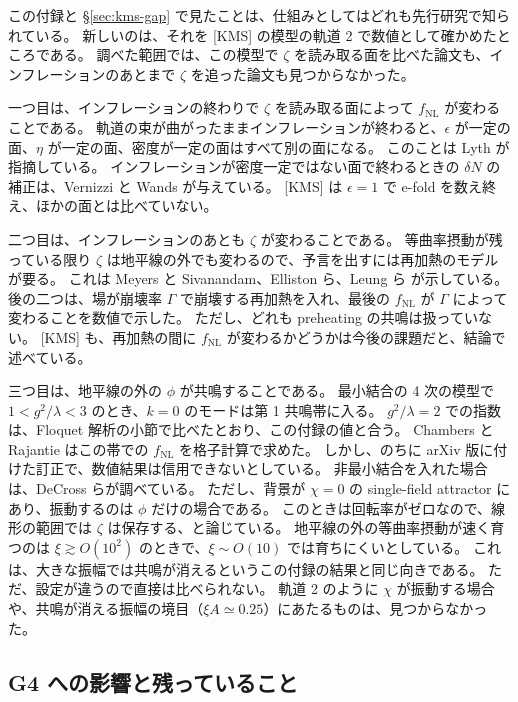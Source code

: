 \documentclass[a4paper,11pt]{ltjsarticle}
\newcommand{\fnl}{f_{\mathrm{NL}}}
\begin{document}
この付録と \S\ref{sec:kms-gap} で見たことは、仕組みとしてはどれも先行研究で知られている。
新しいのは、それを [KMS] の模型の軌道 2 で数値として確かめたところである。
調べた範囲では、この模型で $\zeta$ を読み取る面を比べた論文も、インフレーションのあとまで $\zeta$ を追った論文も見つからなかった。

一つ目は、インフレーションの終わりで $\zeta$ を読み取る面によって $\fnl$ が変わることである。
軌道の束が曲がったままインフレーションが終わると、$\epsilon$ が一定の面、$\eta$ が一定の面、密度が一定の面はすべて別の面になる。
このことは Lyth が指摘している\cite{Lyth2005}。
インフレーションが密度一定ではない面で終わるときの $\delta N$ の補正は、Vernizzi と Wands が与えている\cite{VernizziWands2006}。
[KMS] は $\epsilon=1$ で e-fold を数え終え、ほかの面とは比べていない\cite{KMS2013}。

二つ目は、インフレーションのあとも $\zeta$ が変わることである。
等曲率摂動が残っている限り $\zeta$ は地平線の外でも変わるので、予言を出すには再加熱のモデルが要る。
これは Meyers と Sivanandam\cite{MeyersSivanandam2011}、Elliston ら\cite{EMST2011}、Leung ら\cite{LTBC2012} が示している。
後の二つは、場が崩壊率 $\Gamma$ で崩壊する再加熱を入れ、最後の $\fnl$ が $\Gamma$ によって変わることを数値で示した。
ただし、どれも preheating の共鳴は扱っていない。
[KMS] も、再加熱の間に $\fnl$ が変わるかどうかは今後の課題だと、結論で述べている\cite{KMS2013}。

三つ目は、地平線の外の $\phi$ が共鳴することである。
最小結合の 4 次の模型で $1<g^2/\lambda<3$ のとき、$k=0$ のモードは第 1 共鳴帯に入る\cite{ChambersRajantie2008}。
$g^2/\lambda=2$ での指数は、Floquet 解析の小節で比べたとおり、この付録の値と合う\cite{BFHK2009}。
Chambers と Rajantie はこの帯での $\fnl$ を格子計算で求めた。
しかし、のちに arXiv 版に付けた訂正で、数値結果は信用できないとしている\cite{ChambersRajantie2008}。
非最小結合を入れた場合は、DeCross らが調べている\cite{DeCross2018,DeCross2018b,DeCross2018c}。
ただし、背景が $\chi=0$ の single-field attractor にあり、振動するのは $\phi$ だけの場合である。
このときは回転率がゼロなので、線形の範囲では $\zeta$ は保存する、と論じている\cite{DeCross2018c}。
地平線の外の等曲率摂動が速く育つのは $\xi\gtrsim O(10^2)$ のときで、$\xi\sim O(10)$ では育ちにくいとしている\cite{DeCross2018,DeCross2018c}。
これは、大きな振幅では共鳴が消えるというこの付録の結果と同じ向きである。
ただ、設定が違うので直接は比べられない。
軌道 2 のように $\chi$ が振動する場合や、共鳴が消える振幅の境目（$\xi A\simeq0.25$）にあたるものは、見つからなかった。

\subsection{G4 への影響と残っていること}
\end{document}
